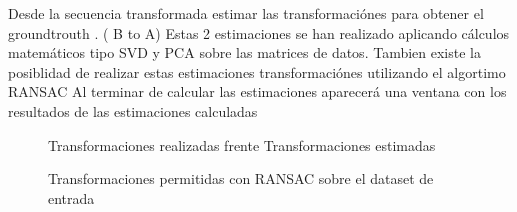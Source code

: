 	Desde la secuencia transformada estimar las transformaciónes para obtener el groundtrouth . ( B to A)
Estas 2 estimaciones se han realizado aplicando cálculos matemáticos tipo SVD y PCA sobre las matrices de datos.
Tambien existe la posiblidad de realizar estas estimaciones transformaciónes utilizando el algortimo RANSAC
Al terminar de calcular las estimaciones aparecerá una ventana con los resultados de las estimaciones calculadas
\begin{figure}[H]
\begin{center}
\hspace{0.5cm}
\end{center}
\caption{Transformaciones realizadas frente Transformaciones estimadas }
\end{figure}


\begin{figure}[H]
\begin{center}
\hspace{0.5cm}
\end{center}
\caption{Transformaciones permitidas con RANSAC sobre el dataset de entrada }
\end{figure}


